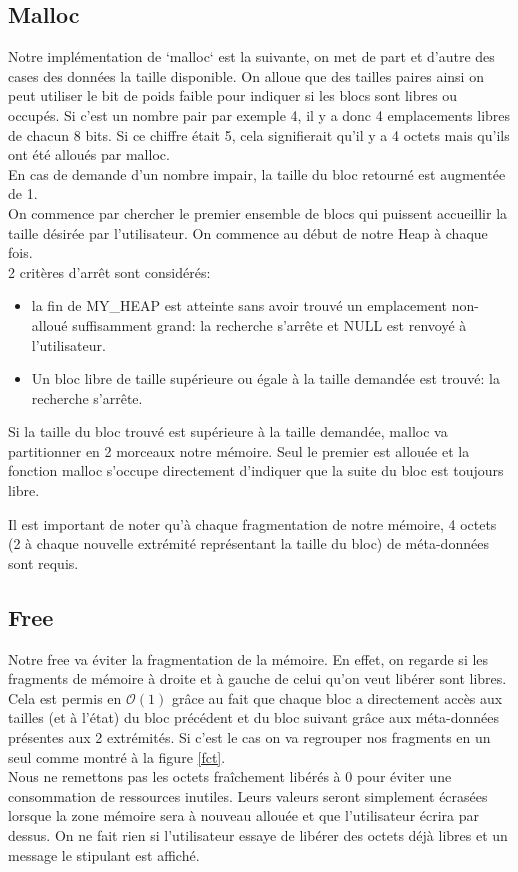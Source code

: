 \documentclass{article}
\begin{document}
\subsection{Malloc}
Notre implémentation de `malloc` est la suivante, on met de part et d'autre des cases des données la taille disponible. On alloue que des tailles paires ainsi on peut utiliser le bit de poids faible pour indiquer si les blocs sont libres ou occupés.  Si c'est un nombre pair par exemple 4, il y a donc 4 emplacements libres de chacun 8 bits. Si ce chiffre était 5, cela signifierait qu'il y a 4 octets mais qu'ils ont été alloués par malloc.\\ 
En cas de demande d'un nombre impair, la taille du bloc retourné est augmentée de 1.\\
On commence par chercher le premier ensemble de blocs qui puissent accueillir la taille désirée par l'utilisateur. On commence au début de notre Heap à chaque fois.\\
2 critères d'arrêt sont considérés:
\begin{itemize}
    \item la fin de MY\_HEAP est atteinte sans avoir trouvé un emplacement non-alloué suffisamment grand: la recherche s'arrête et NULL est renvoyé à l'utilisateur.
    \item Un bloc libre de taille supérieure ou égale à la taille demandée est trouvé: la recherche s'arrête. \newline
\end{itemize}

Si la taille du bloc trouvé est supérieure à la taille demandée, malloc va partitionner en 2 morceaux notre mémoire. Seul le premier est allouée et la fonction malloc s'occupe directement d'indiquer que la suite du bloc est toujours libre.

Il est important de noter qu'à chaque fragmentation de notre mémoire, 4 octets (2 à chaque nouvelle extrémité représentant la taille du bloc) de méta-données sont requis.

\subsection{Free}
\label{free}
Notre free va éviter la fragmentation de la mémoire. En effet, on regarde si les fragments de mémoire à droite et à gauche de celui qu'on veut libérer sont libres.
Cela est permis en $\mathcal{O}(1)$ grâce au fait que chaque bloc a directement accès aux tailles (et à l'état) du bloc précédent et du bloc suivant grâce aux méta-données présentes aux 2 extrémités.
Si c'est le cas on va regrouper nos fragments en un seul comme montré à la figure \ref{fct}.\\
Nous ne remettons pas les octets fraîchement libérés à 0 pour éviter une consommation de ressources inutiles. Leurs valeurs seront simplement écrasées lorsque la zone mémoire sera à nouveau allouée et que l'utilisateur écrira par dessus. On ne fait rien si l'utilisateur essaye de libérer des octets déjà libres et un message le stipulant est affiché.
\end{document}
